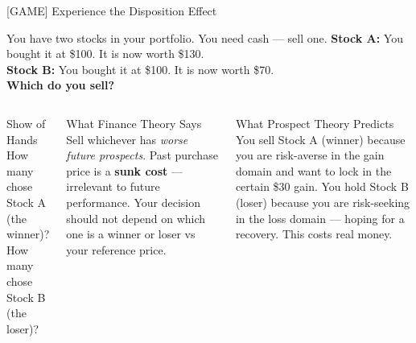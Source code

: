 \documentclass[aspectratio=169]{beamer}
\begin{document}
\begin{frame}{[GAME] Experience the Disposition Effect}
\begin{alertblock}{You have two stocks in your portfolio. You need cash --- sell one.}
\textbf{Stock A:} You bought it at \$100. It is now worth \$130. \\[0.4em]
\textbf{Stock B:} You bought it at \$100. It is now worth \$70. \\[0.4em]
\textbf{Which do you sell?}
\end{alertblock}
\pause
\begin{columns}
\begin{block}{Show of Hands}
How many chose Stock A (the winner)?\\
How many chose Stock B (the loser)?
\end{block}
\begin{exampleblock}{What Finance Theory Says}
Sell whichever has \textit{worse future prospects}. Past purchase price is a \textbf{sunk cost} --- irrelevant to future performance. Your decision should not depend on which one is a winner or loser vs your reference price.
\end{exampleblock}
\begin{alertblock}{What Prospect Theory Predicts}
You sell Stock A (winner) because you are risk-averse in the gain domain and want to lock in the certain \$30 gain. You hold Stock B (loser) because you are risk-seeking in the loss domain --- hoping for a recovery. This costs real money.
\end{alertblock}
\end{columns}
\end{frame}
\end{document}
